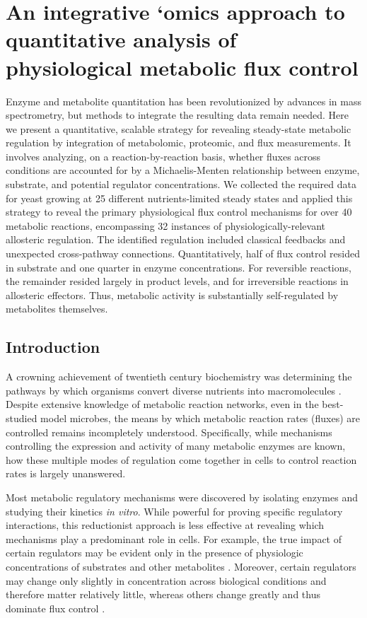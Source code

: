 
\chapter{An integrative `omics approach to quantitative analysis of physiological metabolic flux control\label{ch:slimer}}

Enzyme and metabolite quantitation has been revolutionized by advances in mass spectrometry, but methods to integrate the resulting data remain needed. Here we present a quantitative, scalable strategy for revealing steady-state metabolic regulation by integration of metabolomic, proteomic, and flux measurements. It involves analyzing, on a reaction-by-reaction basis, whether fluxes across conditions are accounted for by a Michaelis-Menten relationship between enzyme, substrate, and potential regulator concentrations. We collected the required data for yeast growing at 25 different nutrients-limited steady states and applied this strategy to reveal the primary physiological flux control mechanisms for over 40 metabolic reactions, encompassing 32 instances of physiologically-relevant allosteric regulation. The identified regulation included classical feedbacks and unexpected cross-pathway connections. Quantitatively, half of flux control resided in substrate and one quarter in enzyme concentrations. For reversible reactions, the remainder resided largely in product levels, and for irreversible reactions in allosteric effectors. Thus, metabolic activity is substantially self-regulated by metabolites themselves.


\section{Introduction}

A crowning achievement of twentieth century biochemistry was determining the pathways by which organisms convert diverse nutrients into macromolecules \cite{Caspi:2014je}. Despite extensive knowledge of metabolic reaction networks, even in the best-studied model microbes, the means by which metabolic reaction rates (fluxes) are controlled remains incompletely understood. Specifically, while mechanisms controlling the expression and activity of many metabolic enzymes are known, how these multiple modes of regulation come together in cells to control reaction rates is largely unanswered.

Most metabolic regulatory mechanisms were discovered by isolating enzymes and studying their kinetics \textit{in vitro}. While powerful for proving specific regulatory interactions, this reductionist approach is less effective at revealing which mechanisms play a predominant role in cells. For example, the true impact of certain regulators may be evident only in the presence of physiologic concentrations of substrates and other metabolites \cite{Fell:1997wg, Tummler:2014cp}. Moreover, certain regulators may change only slightly in concentration across biological conditions and therefore matter relatively little, whereas others change greatly and thus dominate flux control \cite{Kacser:1973fe}. 

